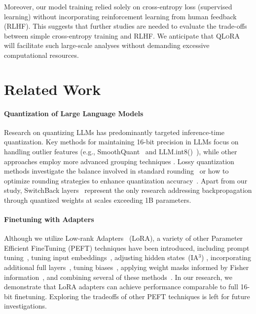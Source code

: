 Moreover, our model training relied solely on cross-entropy loss (supervised learning) without incorporating reinforcement learning from human feedback (RLHF). This suggests that further studies are needed to evaluate the trade-offs between simple cross-entropy training and RLHF. We anticipate that \textsc{QLoRA} will facilitate such large-scale analyses without demanding excessive computational resources.

\section{Related Work}

\paragraph{Quantization of Large Language Models} Research on quantizing LLMs has predominantly targeted inference-time quantization. Key methods for maintaining 16-bit precision in LLMs focus on handling outlier features (e.g., SmoothQuant~\citep{xiao2022smoothquant} and LLM.int8()~\citep{dettmers2022llm}), while other approaches employ more advanced grouping techniques \citep{park2022nuqmm, yao2022zeroquant}. Lossy quantization methods investigate the balance involved in standard rounding~\citep{dettmers2022case,zeng2022glm,pope2022efficiently} or how to optimize rounding strategies to enhance quantization accuracy~\citep{frantar2022gptq}. Apart from our study, SwitchBack layers~\citep{wortsman2023stable} represent the only research addressing backpropagation through quantized weights at scales exceeding 1B parameters.

\paragraph{Finetuning with Adapters} Although we utilize Low-rank Adapters~\citep{hu2021lora} (LoRA), a variety of other Parameter Efficient FineTuning (PEFT) techniques have been introduced, including prompt tuning~\citep{qin2021learning,lester2021power,li2021prefix}, tuning input embeddings~\citep{an2022input}, adjusting hidden states~(IA$^3$) \citep{liu2022few}, incorporating additional full layers~\citep{houlsby2019parameter}, tuning biases~\citep{zaken2021bitfit}, applying weight masks informed by Fisher information~\citep{sung2021training}, and combining several of these methods~\citep{henderson2021compacter}. In our research, we demonstrate that LoRA adapters can achieve performance comparable to full 16-bit finetuning. Exploring the tradeoffs of other PEFT techniques is left for future investigations.

